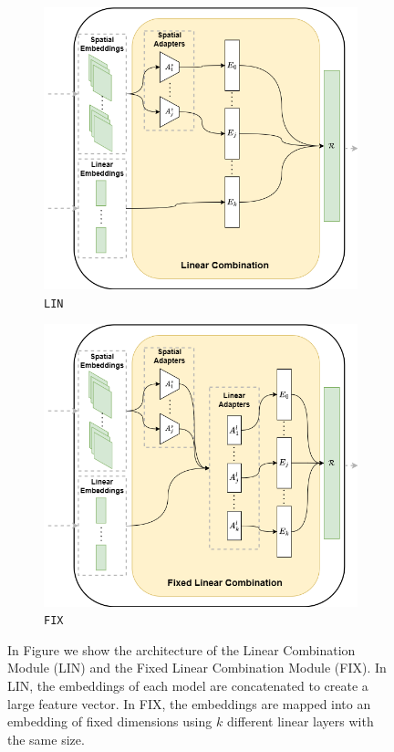 \begin{figure}[ht]
    \centering
    \begin{subfigure}[b]{0.49\textwidth}
        \centering
        \includegraphics[width=\textwidth]{images/lin}
        \caption{\texttt{LIN}}
        \label{fig:lin}
    \end{subfigure}
    \hfill
    \begin{subfigure}[b]{0.49\textwidth}
        \centering
        \includegraphics[width=\textwidth]{images/fix}
        \caption{\texttt{FIX}}
        \label{fig:fix_lin}
    \end{subfigure}

    \caption{In Figure we show the architecture of the Linear Combination Module (LIN) and the Fixed Linear Combination Module (FIX). In LIN, the embeddings of each model are concatenated to create a large feature vector. In FIX, the embeddings are mapped into an embedding of fixed dimensions using $k$ different linear layers with the same size.}
    \label{fig:lin_combination}
\end{figure}





